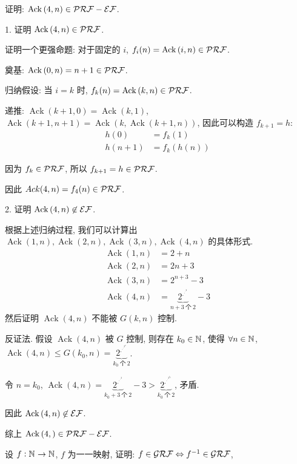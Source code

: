 \newcommand{\Ack}{\operatorname{Ack}{}}

\begin{problem}
证明: $\Ack(4,n) \in \PRF - \EF$.
\end{problem}

\begin{solution}
1. 证明 $\Ack(4, n) \in \PRF$.

证明一个更强命题: 对于固定的 $i$, $f_i(n) = \Ack(i, n) \in \PRF$.

奠基: $\Ack(0, n) = n + 1 \in \PRF$.

归纳假设: 当 $i = k$ 时, $f_k(n) = \Ack(k, n) \in \PRF$.

递推: $\Ack(k+1,0) = \Ack(k, 1)$, $\Ack(k+1, n+1) = \Ack(k, \Ack(k + 1, n))$, 因此可以构造 $f_{k+1} = h$:
\begin{align*}
h(0) & = f_k(1) \\
h(n + 1) & = f_k(h(n))
\end{align*}

因为 $f_k \in \mathcal{PRF}$, 所以 $f_{k+1} = h \in \mathcal{PRF}$.

因此 $Ack(4,n) = f_4(n) \in \mathcal{PRF}$.

2. 证明 $\Ack(4, n) \not\in \EF$.

根据上述归纳过程, 我们可以计算出 $\Ack(1, n), \Ack(2, n), \Ack(3, n), \Ack(4, n)$ 的具体形式.
\begin{align*}
\Ack(1, n) & = 2 + n \\
\Ack(2, n) & = 2n + 3 \\
\Ack(3, n) & = 2^{n+3} - 3 \\
\Ack(4, n) & = \underbrace{2^{{.}^{{.}^{{.}^{2}}}}}_{n+3 ~ \text{个} ~ 2} - 3
\end{align*}
然后证明 $\Ack(4, n)$ 不能被 $G(k, n)$ 控制.

反证法. 假设 $\Ack(4, n)$ 被 $G$ 控制, 则存在 $k_0 \in \mathbb{N}^{}$, 使得 $\forall n \in \mathbb{N}^{}$, $\Ack(4, n) \le G(k_0, n) = \underbrace{2^{{.}^{{.}^{{.}^{2^n}}}}}_{k_0 ~ \text{个} ~ 2}$.

令 $n = k_0$, $\Ack(4, n) = \underbrace{2^{{.}^{{.}^{{.}^{2}}}}}_{k_0 + 3 ~ \text{个} ~ 2} - 3 > \underbrace{2^{{.}^{{.}^{{.}^{2^{k_0}}}}}}_{k_0 ~ \text{个} ~ 2}$, 矛盾.

因此 $\Ack(4, n) \not\in \EF$.

综上 $\Ack(4, ) \in \PRF - \EF$.
\end{solution}

\begin{problem}
设 $f : \mathbb{N}^{} \to \mathbb{N}^{}$, $f$ 为一一映射, 证明: $f \in \mathcal{GRF} \Leftrightarrow f^{-1} \in \mathcal{GRF}$,
\end{problem}

